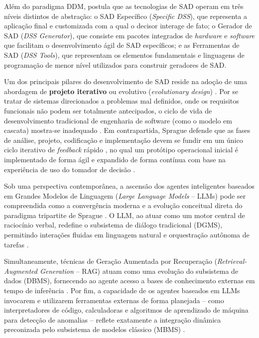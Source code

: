 Além do paradigma DDM,  postula que as tecnologias de SAD operam em três níveis distintos de abstração: o SAD Específico (\textit{Specific DSS}), que representa a aplicação final e customizada com a qual o decisor interage de fato; o Gerador de SAD (\textit{DSS Generator}), que consiste em pacotes integrados de \textit{hardware} e \textit{software} que facilitam o desenvolvimento ágil de SAD específicos; e as Ferramentas de SAD (\textit{DSS Tools}), que representam os elementos fundamentais e linguagens de programação de menor nível utilizados para construir geradores de SAD.

Um dos principais pilares do desenvolvimento de SAD reside na adoção de uma abordagem de \textbf{projeto iterativo} ou evolutivo (\textit{evolutionary design}) \cite{sprague1980framework}. Por se tratar de sistemas direcionados a problemas mal definidos, onde os requisitos funcionais não podem ser totalmente antecipados, o ciclo de vida de desenvolvimento tradicional de engenharia de software (como o modelo em cascata) mostra-se inadequado \cite{sprague1980framework}. Em contrapartida, Sprague defende que as fases de análise, projeto, codificação e implementação devem se fundir em um único ciclo iterativo de \textit{feedback} rápido \cite{sprague1980framework}, no qual um protótipo operacional inicial é implementado de forma ágil e expandido de forma contínua com base na experiência de uso do tomador de decisão \cite{sprague1980framework}.

Sob uma perspectiva contemporânea, a ascensão dos agentes inteligentes baseados em Grandes Modelos de Linguagem (\textit{Large Language Models} -- LLMs) pode ser compreendida como a convergência moderna e a evolução conceitual direta do paradigma tripartite de Sprague \cite{sprague1980framework, cheng2026, zhao2026survey}. O LLM, ao atuar como um motor central de raciocínio verbal, redefine o subsistema de diálogo tradicional (DGMS), permitindo interações fluidas em linguagem natural e orquestração autônoma de tarefas \cite{cheng2026, zhao2026survey}. 

Simultaneamente, técnicas de Geração Aumentada por Recuperação (\textit{Retrieval-Augmented Generation} -- RAG) atuam como uma evolução do subsistema de dados (DBMS), fornecendo ao agente acesso a bases de conhecimento externas em tempo de inferência \cite{zhao2026survey, lewis2020rag}. Por fim, a capacidade de os agentes baseados em LLMs invocarem e utilizarem ferramentas externas de forma planejada -- como interpretadores de código, calculadoras e algoritmos de aprendizado de máquina para detecção de anomalias -- reflete exatamente a integração dinâmica preconizada pelo subsistema de modelos clássico (MBMS) \cite{cheng2026, zhao2026survey}. 


